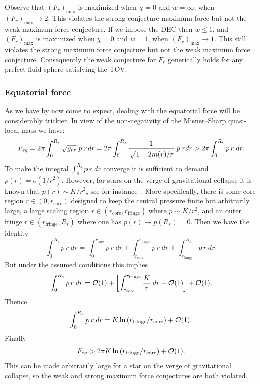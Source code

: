 \documentclass[12pt]{article}
\begin{document}
Observe that $(F_r)_\mathrm{max} $ is maximized when $\chi=0$ and $w=\infty$, when $(F_r)_\mathrm{max}\to 2$. This violates the strong conjecture maximum force but not the weak maximum force conjecture. 
%
If we impose the DEC then $w\leq 1$, and $(F_r)_\mathrm{max} $ is maximized when $\chi=0$ and $w=1$, when $(F_r)_\mathrm{max}\to 1$. This still violates the strong maximum force conjecture but not the weak maximum force conjecture. 
Consequently the weak conjecture for $F_r$ generically holds for any prefect fluid sphere satisfying the TOV.

\subsubsection{Equatorial force}
As we have by now come to expect, dealing with the equatorial force will be considerably trickier. 
In view of the non-negativity of the Misner--Sharp quasi-local mass we have:
\begin{equation}
F_{eq} = 2\pi \int_0^{R_s} \sqrt{g_{rr}} \; p \; r dr
= 2\pi \int_0^{R_s} {1\over\sqrt{1-2m(r)/r}} \; p \; r dr > 2\pi\int_0^{R_s} p \, r \; dr .
\end{equation}
To make the integral $\int_0^{R_s} p \, r \; dr $ converge it is sufficient to demand $p(r) = o(1/r^2)$.
However, for stars on the verge of gravitational collapse it is known that $p(r) \sim K/r^2$, see for instance~\cite{collapse, Yunes}. More specifically, there is some core region $r\in(0,r_\mathrm{core})$ designed to keep the central pressure finite but arbitrarily large, 
a large scaling region $r\in (r_\mathrm{core},r_\mathrm{fringe})$ where $p \sim K/r^2$, and an 
outer fringe $r\in (r_\mathrm{fringe},R_s)$ where one has $p(r)\to p(R_s)=0$. 
Then we have the identity
\begin{equation}
\int_0^{R_s} p \, r \; dr  = \int_0^{r_\mathrm{core}} p \, r \; dr  + \int_{r_\mathrm{core}}^{r_\mathrm{fringe}} p \, r \; dr + \int_{r_\mathrm{fringe}}^{R_s} p \, r \; dr.
\end{equation}
But under the assumed conditions this implies
\begin{equation}
\int_0^{R_s} p \, r \; dr  = {\mathcal{O}}(1) + 
\left[\int_{r_\mathrm{core}}^{r_\mathrm{fringe}} {K\over r} \; dr + {\mathcal{O}}(1) \right] 
+{\mathcal{O}}(1).
\end{equation}
Thence
\begin{equation}
\int_0^{R_s} p \, r \; dr  = K \ln\left({r_\mathrm{fringe}}/r_\mathrm{core} \right)
+{\mathcal{O}}(1).
\end{equation}
Finally
\begin{equation}
F_{eq} > 2\pi K \ln\left({r_\mathrm{fringe}}/r_\mathrm{core} \right)
+{\mathcal{O}}(1).
\end{equation}
This can be made arbitrarily large for a star on the verge of gravitational collapse, so the weak and strong maximum force conjectures are both violated. 
\end{document}
